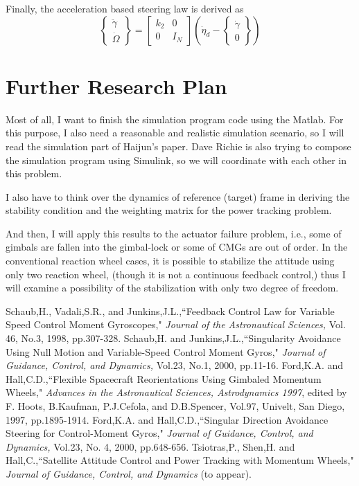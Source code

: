 \documentclass[12pt]{article}
\newcommand{\beq}{\begin{equation}}
\newcommand{\eeq}{\end{equation}}
\begin{document}
Finally, the acceleration based steering law is derived as
\beq
\left\{ \begin{array}{c} \ddot{\gamma} \\ \dot{\Omega} \end{array} \right\}
= \left[ \begin{array}{cc} k_2 & 0 \\  0 & I_N \end{array}
\right]
\left( \dot{\eta}_d - \left\{ \begin{array}{c} \dot{\gamma} \\ 0
\end{array} \right\} \right)
\eeq

\section{Further Research Plan}

Most of all, I want to finish the simulation program code using
the Matlab. For this purpose, I also need a reasonable and
realistic simulation scenario, so I will read the simulation part of Haijun's paper.
Dave Richie is also trying to compose the simulation program using
Simulink, so we will coordinate with each other in this problem.

I also have to think over the dynamics of reference (target)
frame in deriving the stability condition and the weighting matrix
for the power tracking problem.

And then, I will apply this results to the actuator failure
problem, i.e., some of gimbals are fallen into the gimbal-lock or
some of CMGs are out of order. In the conventional reaction wheel
cases, it is possible to stabilize the attitude using only two
reaction wheel, (though it is not a continuous feedback control,)
thus I will examine a possibility of the stabilization with only
two degree of freedom.

\begin{thebibliography}{99}
 Schaub,H., Vadali,S.R., and Junkins,J.L.,``Feedback Control Law for Variable Speed Control Moment
Gyroscopes," {\it Journal of the Astronautical Sciences,} Vol.
46, No.3, 1998, pp.307-328.
 Schaub,H. and Junkins,J.L.,``Singularity
Avoidance Using Null Motion and Variable-Speed Control Moment
Gyros," {\it Journal of Guidance, Control, and Dynamics,}
Vol.23, No.1, 2000, pp.11-16.
 Ford,K.A. and Hall,C.D.,``Flexible Spacecraft
Reorientations Using Gimbaled Momentum Wheels," {\it Advances in
the Astronautical Sciences, Astrodynamics 1997}, edited by F.
Hoots, B.Kaufman, P.J.Cefola, and D.B.Spencer, Vol.97, Univelt,
San Diego, 1997, pp.1895-1914.
 Ford,K.A. and Hall,C.D.,``Singular Direction Avoidance Steering for Control-Moment
Gyros," {\it Journal of Guidance, Control, and Dynamics,} Vol.23, No. 4, 2000, pp.648-656.
 Tsiotras,P., Shen,H. and Hall,C.,``Satellite Attitude Control and Power Tracking with Momentum Wheels," {\it Journal of Guidance, Control, and
Dynamics} (to appear).
\end{thebibliography}
\end{document}
